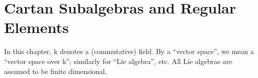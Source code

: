 \chapter{Cartan Subalgebras and Regular Elements}

In this chapter, k denotes a (commutative) field. By a ``vector space'', we mean a ``vector space over k''; similarly for ``Lie algebra'', etc. All Lie algebras are assumed to be finite dimensional.

